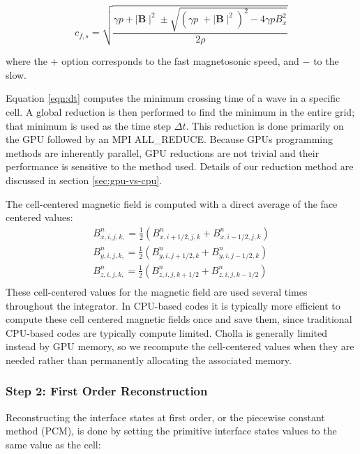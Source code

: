 \documentclass[modern, linenumbers]{aastex631}
\begin{document}
\begin{equation}
    c_{f,s} = \sqrt{\frac
    {\gamma p + \mid \boldsymbol{B} \mid^2 \pm \sqrt{\left( \gamma p \;+ \mid \boldsymbol{B} \mid^2 \right)^2 - 4\gamma p B_x^2 } }
    {2\rho}}
\end{equation}

\noindent where the $+$ option corresponds to the fast magnetosonic speed, and $-$ to the slow.

Equation \ref{eqn:dt} computes the minimum crossing time of a wave in a specific cell. A global reduction is then performed to find the minimum in the entire grid; that minimum is used as the time step $\Delta t$. This reduction is done primarily on the GPU followed by an MPI ALL\_REDUCE. Because GPUs programming methods are inherently parallel, GPU reductions are not trivial and their performance is sensitive to the method used. Details of our reduction method are discussed in section \ref{sec:gpu-vs-cpu}.

The cell-centered magnetic field is computed with a direct average of the face centered values:
\begin{equation}
    \begin{aligned}
        B^n_{x,i,j,k,} = \frac{1}{2} \left( B^n_{x,i+1/2,j,k} + B^n_{x,i-1/2,j,k} \right) \\
        B^n_{y,i,j,k,} = \frac{1}{2} \left( B^n_{y,i,j+1/2,k} + B^n_{y,i,j-1/2,k} \right) \\
        B^n_{z,i,j,k,} = \frac{1}{2} \left( B^n_{z,i,j,k+1/2} + B^n_{z,i,j,k-1/2} \right) \\
    \end{aligned}
\end{equation}
These cell-centered values for the magnetic field are used several times throughout the integrator. In CPU-based codes it is typically more efficient to compute these cell centered magnetic fields once and save them, since traditional CPU-based codes are typically compute limited. Cholla is generally limited instead by GPU memory, so we recompute the cell-centered values when they are needed rather than permanently allocating the associated memory.



\subsubsection{Step 2: First Order Reconstruction}
\label{vlct:first-order-reconstruction}

Reconstructing the interface states at first order, or the piecewise constant method (PCM), is done by setting the primitive interface states values to the same value as the cell:
\end{document}
